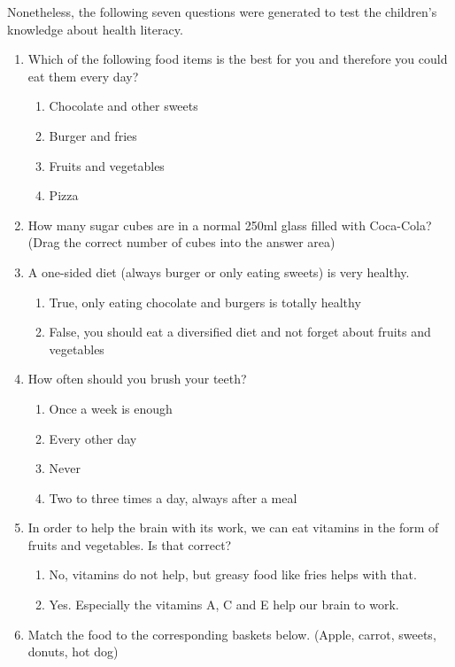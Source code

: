 Nonetheless, the following seven questions were generated to test the children's knowledge about health literacy. 
\begin{enumerate}
    \item Which of the following food items is the best for you and therefore you could eat them every day?
    \begin{enumerate}
        \item Chocolate and other sweets
        \item Burger and fries
        \item Fruits and vegetables
        \item Pizza
    \end{enumerate}
    \item How many sugar cubes are in a normal 250ml glass filled with Coca-Cola? (Drag the correct number of cubes into the answer area)
    \item A one-sided diet (always burger or only eating sweets) is very healthy.
    \begin{enumerate}
        \item True, only eating chocolate and burgers is totally healthy
        \item False, you should eat a diversified diet and not forget about fruits and vegetables
    \end{enumerate}
    \item How often should you brush your teeth?
    \begin{enumerate}
        \item Once a week is enough
        \item Every other day
        \item Never
        \item Two to three times a day, always after a meal
    \end{enumerate}
    \item In order to help the brain with its work, we can eat vitamins in the form of fruits and vegetables. Is that correct? 
    \begin{enumerate}
        \item No, vitamins do not help, but greasy food like fries helps with that.
        \item Yes. Especially the vitamins A, C and E help our brain to work.
    \end{enumerate}
    \item Match the food to the corresponding baskets below. (Apple, carrot, sweets, donuts, hot dog)
    \begin{enumerate}

\end{enumerate}
\end{enumerate}
